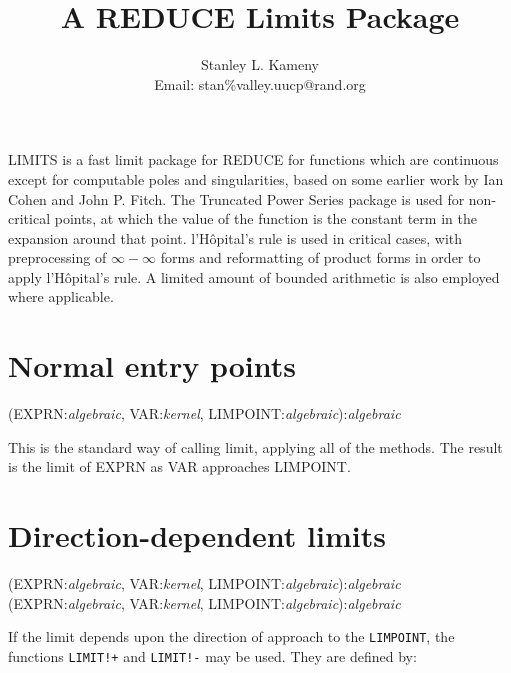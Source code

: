 \title{A REDUCE Limits Package}
\date{}
\author{Stanley L. Kameny \\ Email: stan\%valley.uucp@rand.org}

\maketitle

LIMITS is a fast limit package for REDUCE for functions which are
continuous except for computable poles and singularities, based on some
earlier work by Ian Cohen and John P. Fitch.  The Truncated Power Series
package is used for non-critical points, at which the value of the
function is the constant term in the expansion around that point.
l'H\^opital's rule is used in critical cases, with preprocessing of
$\infty - \infty$ forms and reformatting of product forms in order
to apply l'H\^opital's rule.  A limited amount of bounded arithmetic
is also employed where applicable.

\section{Normal entry points}
\vspace{.1in}
(EXPRN:{\em algebraic}, VAR:{\em kernel},
LIMPOINT:{\em algebraic}):{\em algebraic}
\vspace{.1in}

This is the standard way of calling limit, applying all of the methods. The
result is the limit of EXPRN as VAR approaches LIMPOINT.


\section{Direction-dependent limits}

 
\vspace{.1in}
(EXPRN:{\em algebraic}, VAR:{\em kernel},
LIMPOINT:{\em algebraic}):{\em algebraic} \\
(EXPRN:{\em algebraic}, VAR:{\em kernel},
LIMPOINT:{\em algebraic}):{\em algebraic}
\vspace{.1in}

If the limit depends upon the direction of approach to the {\tt LIMPOINT},
the functions {\tt LIMIT!+} and {\tt LIMIT!-} may be used.  They are
defined by:

